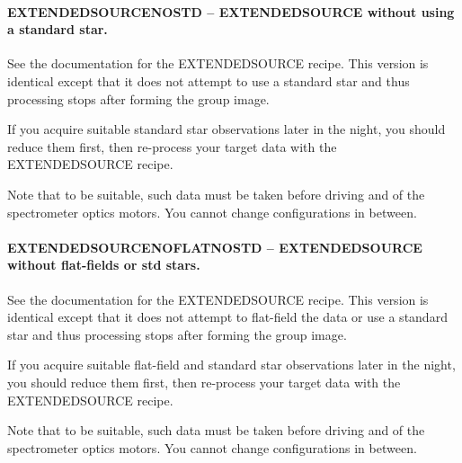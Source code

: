 \documentclass[twoside,11pt]{article}
\renewcommand{\_}{\texttt{\symbol{95}}}
\begin{document}
\paragraph*{EXTENDED\_SOURCE\_NOSTD -- EXTENDED\_SOURCE without using a standard star.\label{EXTENDED_SOURCE_NOSTD_--_EXTENDED_SOURCE_without_using_a_standard_star_}}



\mbox{}

See the documentation for the EXTENDED\_SOURCE recipe. This version is
identical except that it does not attempt to use a standard star and
thus processing stops after forming the group image.



If you acquire suitable standard star observations later in the night,
you should reduce them first, then re-process your target data with
the EXTENDED\_SOURCE recipe.



Note that to be suitable, such data must be taken before driving and
of the spectrometer optics motors. You cannot change configurations
in between.


\paragraph*{EXTENDED\_SOURCE\_NOFLAT\_NOSTD -- EXTENDED\_SOURCE without flat-fields or std stars.\label{EXTENDED_SOURCE_NOFLAT_NOSTD_--_EXTENDED_SOURCE_without_flat-fields_or_std_stars_}}



\mbox{}

See the documentation for the EXTENDED\_SOURCE recipe. This version is
identical except that it does not attempt to flat-field the data or
use a standard star and thus processing stops after forming the group
image.



If you acquire suitable flat-field and standard star observations later
in the night, you should reduce them first, then re-process your
target data with the EXTENDED\_SOURCE recipe.



Note that to be suitable, such data must be taken before driving and
of the spectrometer optics motors. You cannot change configurations
in between.
\end{document}
